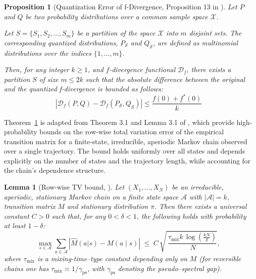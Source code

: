 \documentclass{article}
\theoremstyle{plain}
\newtheorem{proposition}[theorem]{Proposition}
\newtheorem{lemma}[theorem]{Lemma}
\theoremstyle{definition}
\theoremstyle{remark}
\begin{document}
\begin{proposition}[Quantization Error of f-Divergence, Proposition 13 in \cite{pillutla2023mauvescoresgenerativemodels}]\label{prop:quantization-error}
Let $P$ and $Q$ be two probability distributions over a common sample space $\mathcal{X}$.

Let ${S} = \{S_1, S_2, \dots, S_m\}$ be a partition of the space $\mathcal{X}$ into $m$ disjoint sets. The corresponding quantized distributions, $P_{\mathcal{S}}$ and $Q_{\mathcal{S}}$, are defined as multinomial distributions over the indices $\{1, \dots, m\}$.

Then, for any integer $k \ge 1$, and $f$-divergence functional $\mathcal{D}_f$, there exists a partition ${S}$ of size $m \le 2k$ such that the absolute difference between the original and the quantized f-divergence is bounded as follows:
\[
|\mathcal{D}_f(P,Q) - \mathcal{D}_{f}(P_{\mathcal{S}},Q_{\mathcal{S}})| \le \frac{f(0) + f^{*}(0)}{k}
\]
\end{proposition}



Theorem~\ref{conditional-row-tv-bound} is adapted from Theorem 3.1 and Lemma 3.1 of \cite{wolfer2023empiricalinstancedependentestimationmarkov}, which provide high-probability bounds on the row-wise total variation error of the empirical transition matrix for a finite-state, irreducible, aperiodic Markov chain observed over a single trajectory. The bound holds uniformly over all states and depends explicitly on the number of states and the trajectory length, while accounting for the chain’s dependence structure.

\begin{lemma}[Row-wise TV bound, \citet{wolfer2023empiricalinstancedependentestimationmarkov}]\label{conditional-row-tv-bound}
Let $(X_1, \dots, X_N)$ be an irreducible, aperiodic, stationary Markov chain on a finite state space $\mathcal{A}$ with $|\mathcal{A}|=k$, transition matrix $M$ and stationary distribution $\pi$. Then there exists a universal constant $C>0$ such that, for any $0 < \delta < 1$, the following holds with probability at least $1-\delta$:
\[
\max_{s\in\mathcal{A}} \sum_{a \in \mathcal{A}}
\left| \hat{M}(a|s)
 -  M(a\mid s)
\right|
\;\le\;
C \, \sqrt{\,\frac{\tau_{\mathrm{mix}} k\, \log\left(\frac{k N}{\delta}\right)}{\,N}} ,
\]
where $\tau_{\mathrm{mix}}$ is a mixing-time–type constant depending only on $M$ (for reversible chains one has $\tau_{\mathrm{mix}} \asymp 1/\gamma_{\mathrm{ps}}$, with $\gamma_{\mathrm{ps}}$ denoting the pseudo–spectral gap).
\end{lemma}
\end{document}
